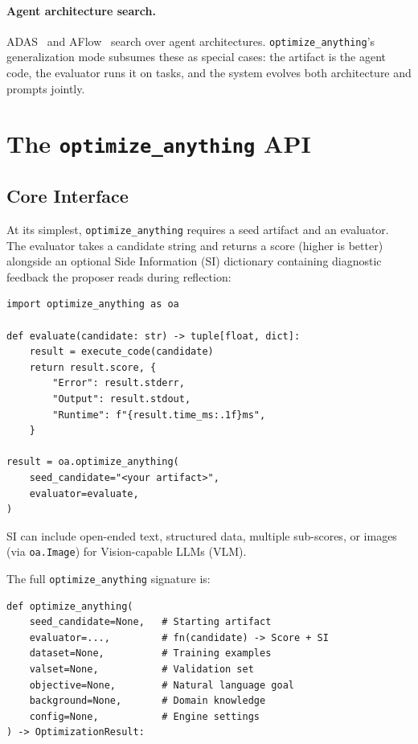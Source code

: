 \documentclass[sigconf]{acmart}
\newcommand{\oa}{\texttt{optimize\_anything}}
\newcommand{\asi}{SI}
\begin{document}
\paragraph{Agent architecture search.}
ADAS~\cite{hu2024automated} and AFlow~\cite{zhang2024aflow} search over agent architectures. \oa{}'s generalization mode subsumes these as special cases: the artifact is the agent code, the evaluator runs it on tasks, and the system evolves both architecture and prompts jointly.

\section{The \oa{} API}\label{sec:api}

\subsection{Core Interface}

At its simplest, \oa{} requires a seed artifact and an evaluator. The evaluator takes a candidate string and returns a score (higher is better) alongside an optional Side Information (\asi{}) dictionary containing diagnostic feedback the proposer reads during reflection:

\begin{lstlisting}
import optimize_anything as oa

def evaluate(candidate: str) -> tuple[float, dict]:
    result = execute_code(candidate)
    return result.score, {
        "Error": result.stderr,
        "Output": result.stdout,
        "Runtime": f"{result.time_ms:.1f}ms",
    }

result = oa.optimize_anything(
    seed_candidate="<your artifact>",
    evaluator=evaluate,
)
\end{lstlisting}

\asi{} can include open-ended text, structured data, multiple sub-scores, or images (via \texttt{oa.Image}) for Vision-capable LLMs (VLM).

The full \oa{} signature is:
\begin{lstlisting}
def optimize_anything(
    seed_candidate=None,   # Starting artifact
    evaluator=...,         # fn(candidate) -> Score + SI
    dataset=None,          # Training examples
    valset=None,           # Validation set
    objective=None,        # Natural language goal
    background=None,       # Domain knowledge
    config=None,           # Engine settings
) -> OptimizationResult:
\end{lstlisting}
\end{document}
